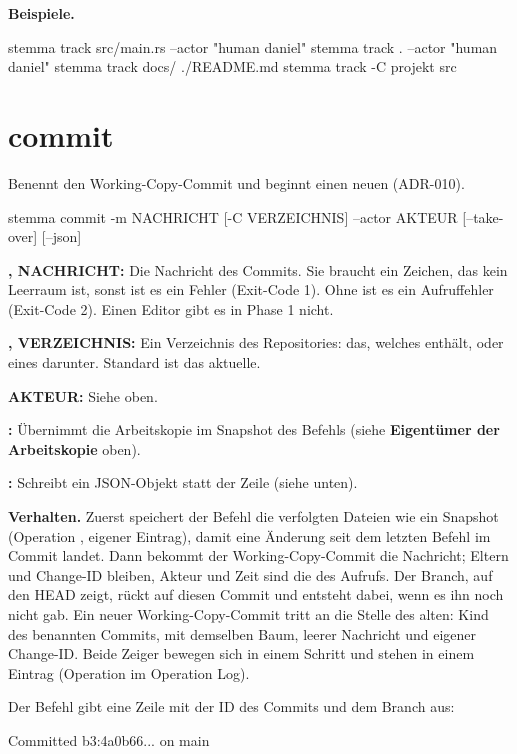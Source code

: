 {\bf Beispiele.}

\starttyping
stemma track src/main.rs --actor "human daniel"
stemma track . --actor "human daniel"
stemma track docs/ ./README.md
stemma track -C projekt src
\stoptyping

\section{commit}

Benennt den Working-Copy-Commit und beginnt einen neuen (ADR-010).

\starttyping
stemma commit -m NACHRICHT [-C VERZEICHNIS] --actor AKTEUR [--take-over] [--json]
\stoptyping

\startitemize
\item {\bf {},  NACHRICHT:} Die Nachricht des Commits. Sie braucht
ein Zeichen, das kein Leerraum ist, sonst ist es ein Fehler (Exit-Code 1). Ohne 
ist es ein Aufruffehler (Exit-Code 2). Einen Editor gibt es in Phase 1 nicht.
\item {\bf {},  VERZEICHNIS:} Ein Verzeichnis des Repositories:
das, welches  enthält, oder eines darunter. Standard ist das aktuelle.
\item {\bf {} AKTEUR:} Siehe oben.
\item {\bf {}:} Übernimmt die Arbeitskopie im Snapshot des Befehls
(siehe {\bf Eigentümer der Arbeitskopie} oben).
\item {\bf {}:} Schreibt ein JSON-Objekt statt der Zeile (siehe unten).
\stopitemize

{\bf Verhalten.} Zuerst speichert der Befehl die verfolgten Dateien wie ein Snapshot
(Operation , eigener Eintrag),
damit eine Änderung seit dem letzten Befehl im Commit landet.
Dann bekommt der Working-Copy-Commit die Nachricht;
Eltern und Change-ID bleiben, Akteur und Zeit sind die des Aufrufs.
Der Branch, auf den HEAD zeigt, rückt auf diesen Commit
und entsteht dabei, wenn es ihn noch nicht gab.
Ein neuer Working-Copy-Commit tritt an die Stelle des alten:
Kind des benannten Commits, mit demselben Baum, leerer Nachricht und eigener Change-ID.
Beide Zeiger bewegen sich in einem Schritt und stehen in einem Eintrag
(Operation  im Operation Log).

Der Befehl gibt eine Zeile mit der ID des Commits und dem Branch aus:

\starttyping
Committed b3:4a0b66... on main
\stoptyping


